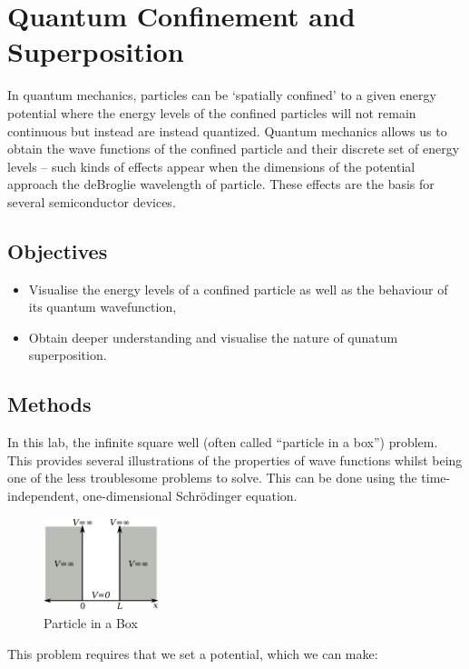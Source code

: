\renewcommand{\chaptername}{Feb 8th: Lab}
\chapter{Quantum Confinement and Superposition}
In quantum mechanics, particles can be `spatially confined' to a given energy potential where the energy levels of the confined particles will not remain continuous but instead are instead quantized.
Quantum mechanics allows us to obtain the wave functions of the confined particle and their discrete set of energy levels -- such kinds of effects appear when the dimensions of the potential approach the deBroglie wavelength of particle. These effects are the basis for several semiconductor devices.

\section{Objectives}
\begin{itemize}
    \item Visualise the energy levels of a confined particle as well as the behaviour of its quantum wavefunction,
    \item Obtain deeper understanding and visualise the nature of qunatum superposition.
\end{itemize}

\section{Methods}
In this lab, the infinite square well (often called ``particle in a box'') problem. This provides several illustrations of the properties of wave functions whilst being one of the less troublesome problems to solve. This can be done using the time-independent, one-dimensional Schrödinger equation.

\begin{figure}[h]
    \centering
    \includegraphics[width=0.3\textwidth]{lab1/images/pIAB.png}
    \caption{Particle in a Box}
    \label{fig:particleInABox}
\end{figure}

This problem requires that we set a potential, which we can make:

